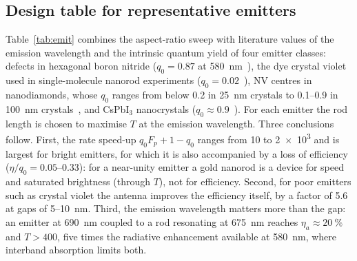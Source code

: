 \documentclass[11pt,a4paper]{article}
\newcommand{\Fp}{F_p}
\begin{document}
\subsection{Design table for representative emitters}
Table~\ref{tab:emit} combines the aspect-ratio sweep with literature values of the emission wavelength and the
intrinsic quantum yield of four emitter classes: defects in hexagonal boron nitride ($q_0=0.87$ at
\SI{580}{nm}~\cite{nikolay2019}), the dye crystal violet used in single-molecule nanorod experiments
($q_0=0.02$~\cite{khatua}), NV centres in nanodiamonds, whose $q_0$ ranges from below 0.2 in \SI{25}{nm} crystals to
0.1--0.9 in \SI{100}{nm} crystals~\cite{mohtashami2013}, and CsPbI$_3$ nanocrystals ($q_0\approx0.9$~\cite{protesescu2015}).
For each emitter the rod length is chosen to maximise $T$ at the emission wavelength. Three conclusions follow. First,
the rate speed-up $q_0\Fp+1-q_0$ ranges from 10 to \num{2e3} and is largest for bright emitters, for which it is
also accompanied by a loss of efficiency ($\eta/q_0=0.05$--0.33): for a near-unity emitter a gold nanorod is a
device for speed and saturated brightness (through $T$), not for efficiency. Second, for poor emitters such as
crystal violet the antenna improves the efficiency itself, by a factor of 5.6 at gaps of 5--\SI{10}{nm}. Third, the
emission wavelength matters more than the gap: an emitter at \SI{690}{nm} coupled to a rod resonating at
\SI{675}{nm} reaches $\eta_a\approx\SI{20}{\percent}$ and $T>400$, five times the radiative enhancement available at
\SI{580}{nm}, where interband absorption limits both.
\end{document}

